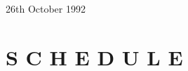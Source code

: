 \documentclass[a4paper]{article}
\newcommand{\parthead}{}
\begin{document}
26th October 1992

\clearpage

\part[Schedule]{S C H E D U L E}

%

%
%
%
%
%
%
%
\end{document}

